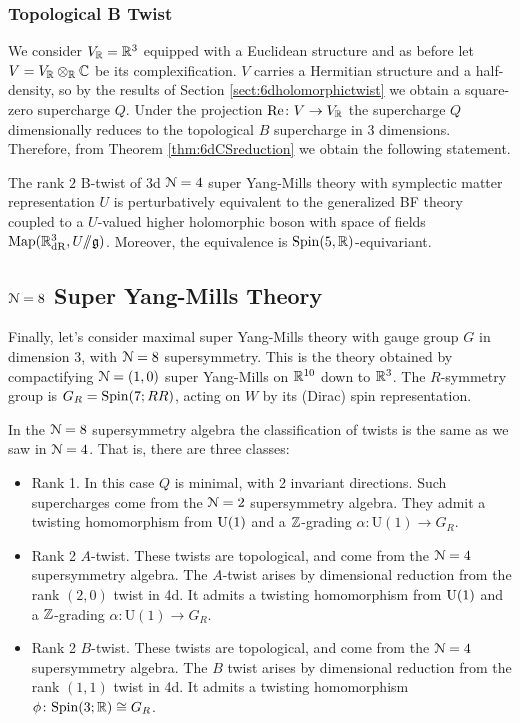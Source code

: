 \documentclass[10pt, oneside]{article}
\renewcommand{\Re}{\mathrm{Re}}
\renewcommand{\U}{\mathrm{U}}
\newcommand{\ham}{/\!\!/}
\begin{document}
\subsubsection{Topological B Twist}
\label{sect:3d_4_B_twist}
We consider $V_\mathbb R=\mathbb R^3$ equipped with a Euclidean structure and as before let $V=V_\mathbb R\otimes_\mathbb R\mathbb C$ be its complexification. $V$ carries a Hermitian structure and a half-density, so by the results of Section \ref{sect:6dholomorphictwist} we obtain a square-zero supercharge $Q$. Under the projection $\Re\colon V\rightarrow V_\RR$ the supercharge $Q$ dimensionally reduces to the topological $B$ supercharge in 3 dimensions. Therefore, from Theorem \ref{thm:6dCSreduction} we obtain the following statement.

\begin{theorem} \label{3d_4_B_twist_thm}
The rank $2$ B-twist of 3d $\mathcal{N}=4$ super Yang-Mills theory with symplectic matter representation $U$ is perturbatively equivalent to the generalized BF theory coupled to a $U$-valued higher holomorphic boson with space of fields $\mr{Map}(\RR^3_{\mr{dR}}, U\ham \gg)$. Moreover, the equivalence is $\mathrm{Spin}(5, \mathbb R)$-equivariant. 
\end{theorem}

\subsection{\texorpdfstring{$\mathcal N = 8$}{N=8} Super Yang-Mills Theory} \label{3d_8_section}
Finally, let's consider maximal super Yang-Mills theory with gauge group $G$ in dimension 3, with $\mathcal{N}=8$ supersymmetry.  This is the theory obtained by compactifying $\mathcal{N}=(1,0)$ super Yang-Mills on $\mathbb R^{10}$ down to $\mathbb R^3$.  The $R$-symmetry group is $G_R = \mathrm{Spin}(7;
RR)$, acting on $W$ by its (Dirac) spin representation.

In the $\mathcal{N}=8$ supersymmetry algebra the classification of twists is the same as we saw in $\mathcal{N}=4$.  That is, there are three classes: 
\begin{itemize}
 \item Rank 1.  In this case $Q$ is minimal, with 2 invariant directions.  Such supercharges come from the $\mathcal{N}=2$ supersymmetry algebra.  They admit a twisting homomorphism from $\mathrm{U}(1)$ and a $\mathbb Z$-grading $\alpha \colon \U(1) \to G_R$.
 \item Rank 2 $A$-twist.  These twists are topological, and come from the $\mathcal{N}=4$ supersymmetry algebra.  The $A$-twist arises by dimensional reduction from the rank $(2,0)$ twist in 4d.  It admits a twisting homomorphism from $\mathrm{U}(1)$ and a $\mathbb Z$-grading $\alpha \colon \U(1) \to G_R$.
 \item Rank 2 $B$-twist.   These twists are topological, and come from the $\mathcal{N}=4$ supersymmetry algebra. The $B$ twist arises by dimensional reduction from the rank $(1,1)$ twist in 4d.  It admits a twisting homomorphism $\phi \colon \mathrm{Spin}(3;\mathbb R) \cong G_R$.
\end{itemize}
 
\end{document}
